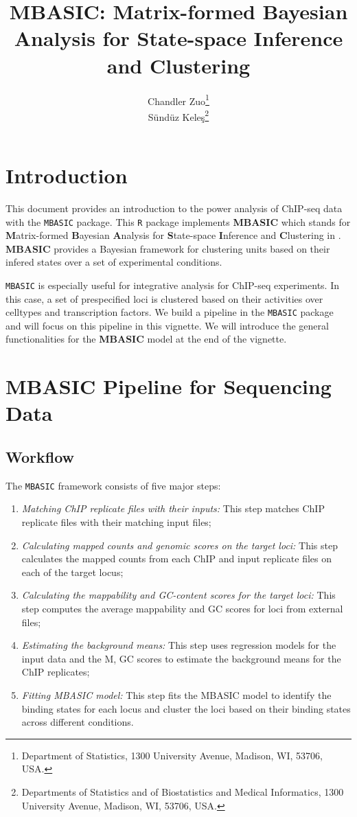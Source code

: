 \documentclass[a4paper,10pt]{article}
\title{MBASIC: Matrix-formed Bayesian Analysis for State-space Inference and Clustering}
\author{Chandler Zuo\footnote{Department of Statistics, 1300 University Avenue, Madison, WI, 53706, USA.}  \\ 
S\"und\"uz Kele\c{s}\footnote{Departments of Statistics and of  Biostatistics and Medical Informatics, 1300 University Avenue, Madison, WI, 53706, USA.}}
\date{}
\begin{document}
\maketitle

\tableofcontents

\section{Introduction}

This document provides an introduction to the power analysis of ChIP-seq data with
the \texttt{MBASIC} package. This \texttt{R} package implements \textbf{MBASIC} which stands for \textbf{M}atrix-formed \textbf{B}ayesian \textbf{A}nalysis for \textbf{S}tate-space \textbf{I}nference and \textbf{C}lustering in \cite{zuo14}. \textbf{MBASIC} provides a Bayesian framework for clustering units based on their infered states over a set of experimental conditions.

\texttt{MBASIC} is especially useful for integrative analysis for ChIP-seq experiments. In this case, a set of prespecified loci is clustered based on their activities over celltypes and transcription factors. We build a pipeline in the \texttt{MBASIC} package and will focus on this pipeline in this vignette. We will introduce the general functionalities for the \textbf{MBASIC} model at the end of the vignette.

\section{MBASIC Pipeline for Sequencing Data}

\subsection{Workflow}

The \texttt{MBASIC} framework consists of five major steps:

\begin{enumerate}
  \item \textit{Matching ChIP replicate files with their inputs:} This step matches ChIP replicate files with their matching input files;
  \item \textit{Calculating mapped counts and genomic scores on the target loci:} This step calculates the mapped counts from each ChIP and input replicate files on each of the target locus;
  \item \textit{Calculating the mappability and GC-content scores for the target loci:} This step computes the average mappability and GC scores for loci from external files;
  \item \textit{Estimating the background means:} This step uses regression models for the input data and the M, GC scores to estimate the background means for the ChIP replicates;
  \item \textit{Fitting MBASIC model:} This step fits the MBASIC model to identify the binding states for each locus and cluster the loci based on their binding states across different conditions.
\end{enumerate}
\end{document}
